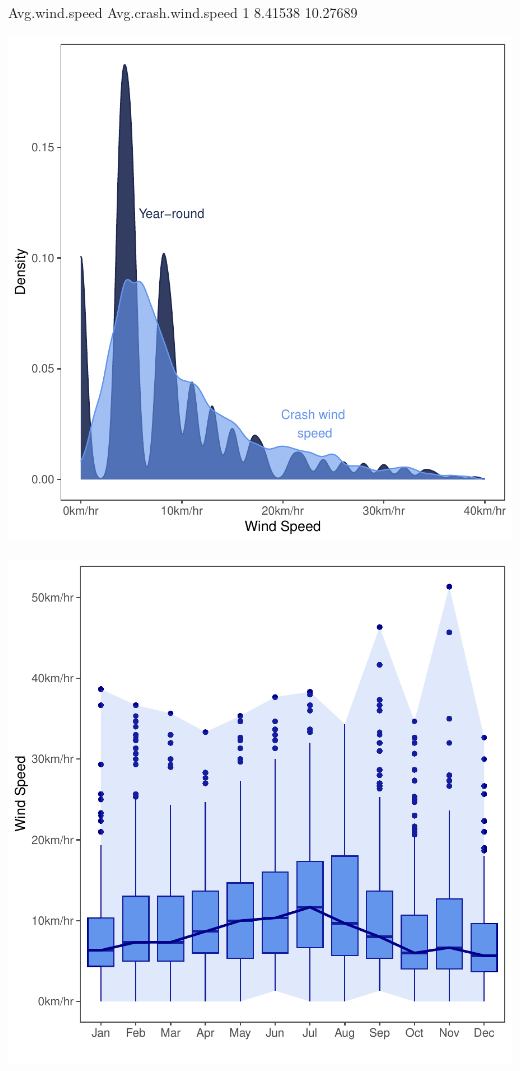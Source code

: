 \documentclass[11pt, a4paper]{article}
\begin{document}
\begin{Schunk}
\begin{Soutput}
  Avg.wind.speed Avg.crash.wind.speed
1        8.41538             10.27689
\end{Soutput}
\end{Schunk}
\includegraphics{variableinvestigation-013}

\includegraphics{variableinvestigation-014}
\end{document}
